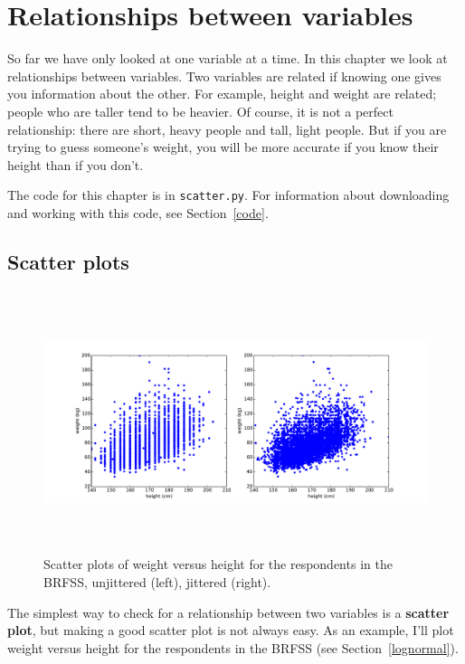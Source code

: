 \documentclass[12pt]{book}
\begin{document}
\chapter{Relationships between variables}

So far we have only looked at one variable at a time.  In this
chapter we look at relationships between variables.  Two variables are
related if knowing one gives you information about the other.  For
example, height and weight are related; people who are taller tend to
be heavier.  Of course, it is not a perfect relationship: there
are short, heavy people and tall, light people.  But if you are
trying to guess someone's weight, you will be more accurate if you
know their height than if you don't.

The code for this chapter is in {\tt scatter.py}.
For information about downloading and
working with this code, see Section~\ref{code}.


\section{Scatter plots}

\begin{figure}
\centerline{\includegraphics[height=3.0in]{figs/scatter1.pdf}}
\caption{Scatter plots of weight versus height for the respondents
in the BRFSS, unjittered (left), jittered (right).}
\label{scatter1}
\end{figure}

The simplest way to check for a relationship between two variables
is a {\bf scatter plot}, but making a good scatter plot is not always easy.
As an example, I'll plot weight versus height for the respondents
in the BRFSS (see Section~\ref{lognormal}).
\end{document}
